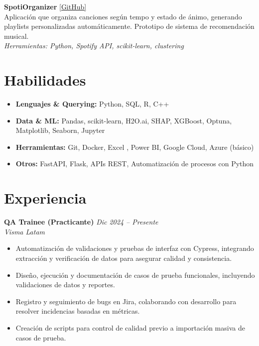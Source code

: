 \documentclass[a4paper,10pt]{article}
\begin{document}
\vspace{0.7em}

\textbf{SpotiOrganizer} \hfill \href{https://github.com/R0SEWT/spotify-playlist-organizer}{[GitHub]}\\
Aplicación que organiza canciones según tempo y estado de ánimo, generando playlists personalizadas automáticamente. Prototipo de sistema de recomendación musical.\\
\textit{Herramientas: Python, Spotify API, scikit-learn, clustering}

\section*{Habilidades}
\begin{itemize}[leftmargin=1.5em, itemsep=0.2em]
    \item \textbf{Lenguajes \& Querying:} Python, SQL, R, C++
    \item \textbf{Data \& ML:} Pandas, scikit-learn, H2O.ai, SHAP, XGBoost, Optuna, Matplotlib, Seaborn, Jupyter
    \item \textbf{Herramientas:} Git, Docker, Excel , Power BI, Google Cloud, Azure (básico)
    \item \textbf{Otros:} FastAPI, Flask, APIs REST, Automatización de procesos con Python
\end{itemize}

\section*{Experiencia}
\textbf{QA Trainee (Practicante)} \hfill \textit{Dic 2024 – Presente}\\
\textit{Visma Latam}
\begin{itemize}[leftmargin=1.5em]
    \item Automatización de validaciones y pruebas de interfaz con Cypress, integrando extracción y verificación de datos para asegurar calidad y consistencia.
    \item Diseño, ejecución y documentación de casos de prueba funcionales, incluyendo validaciones de datos y reportes.
    \item Registro y seguimiento de bugs en Jira, colaborando con desarrollo para resolver incidencias basadas en métricas.
    \item Creación de scripts para control de calidad previo a importación masiva de casos de prueba.
\end{itemize}
\end{document}
